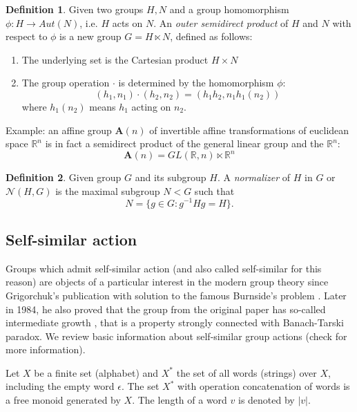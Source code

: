\documentclass[a4paper,12pt]{amsart}
\theoremstyle{definition}
\newtheorem{definition}{Definition}
\begin{document}
	
	\begin{definition}
		Given two groups $H, N$ and a group homomorphism $\phi : H \rightarrow Aut(N)$, i.e. $H$ acts on $N$. An \textit{outer semidirect product} of $H$ and $N$ with respect to $\phi$ is a new group $G = H \ltimes N$, defined as follows: 
		
		\begin{enumerate}[label=\arabic*.]
			\item The underlying set is the Cartesian product $H \times N$
			\item The group operation $\cdot$ is determined by the homomorphism $\phi$: 
			$$
			(h_1, n_1) \cdot (h_2, n_2) = (h_1 h_2, n_1 h_1(n_2))
			$$
			where $h_1 (n_2)$ means $h_1$ acting on $n_2$.
		\end{enumerate}
		
		Example: an affine group $\mathbf{A}(n)$ of invertible affine transformations of euclidean space $\mathbb{R}^n$ is in fact a semidirect product of the general linear group and the $\mathbb{R}^n$: 
		$$\mathbf{A}(n) = GL(\mathbb{R}, n) \ltimes \mathbb{R}^n$$
		
	\end{definition}
	
	
	\begin{definition}
		Given group $G$ and its subgroup $H$. A \textit{normalizer} of $H$ in $G$ or $\mathcal{N}(H, G)$ is the maximal subgroup $N < G$ such that 
		$$
		N = \{g \in G : g^{-1}Hg = H\}.
		$$
	\end{definition}
	
	\subsection{Self-similar action}
	
	Groups which admit self-similar action (and also called self-similar for this reason) are objects of a particular interest in the modern group theory since Grigorchuk's publication with solution to the famous Burnside's problem \cite{Grygorchuk:original}. Later in 1984, he also proved that the group from the original paper has so-called intermediate growth \cite{Grygorchuk:growth}, that is a property strongly connected with Banach-Tarski paradox. We review basic information about self-similar group actions (check \cite{Nekrashevych:self-similar} for more information).
	
	
	Let $X$ be a finite set (alphabet) and $X^{*}$ the set of all words (strings) over $X$, including the empty word $\epsilon$. The set $X^{*}$ with operation concatenation of words is a free monoid generated by $X$. The length of a word $v$ is denoted by $|v|$.
	
\end{document}
